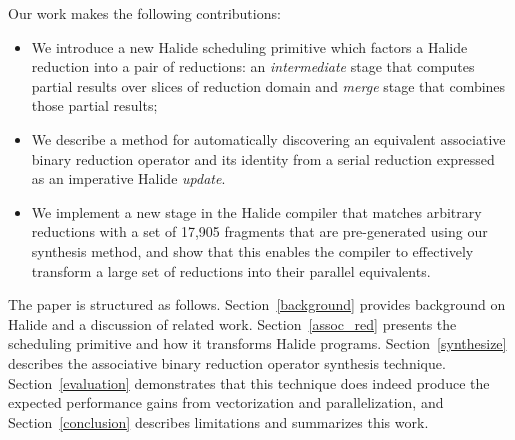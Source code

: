 \begin{figure}
{}
\label{fig:rfactor}
\end{figure}

Our work makes the following contributions:
\begin{itemize}
  \item We introduce a new Halide scheduling primitive  which factors a Halide reduction into a pair of reductions: an \emph{intermediate} stage that computes partial results over slices of reduction domain and \emph{merge} stage that combines those partial results;
  \item We describe a method for automatically discovering an equivalent associative binary reduction operator and its identity from a serial reduction expressed as an imperative Halide \emph{update}.
  \item We implement a new stage in the Halide compiler that matches arbitrary reductions with a set of 17,905 fragments that are pre-generated using our synthesis method, and show that this enables the compiler to effectively transform a large set of reductions into their parallel equivalents.
\end{itemize}

The paper is structured as follows. Section~\ref{background} provides background on Halide and a discussion of related work. Section~\ref{assoc_red} presents the  scheduling primitive and how it transforms Halide programs. Section~\ref{synthesize} describes the associative binary reduction operator synthesis technique. Section~\ref{evaluation} demonstrates that this technique does indeed produce the expected performance gains from vectorization and parallelization, and Section~\ref{conclusion} describes limitations and summarizes this work.


